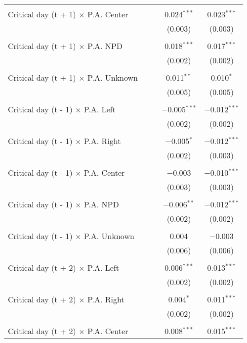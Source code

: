 \documentclass[
]{article}
\begin{document}
\begin{table}[!htbp]
{\begin{tabular}{@{\extracolsep{5pt}}lcccc}
  & & & & \\ 
 Critical day (t + 1) $\times$ P.A. Center &  &  & 0.024$^{***}$ & 0.023$^{***}$ \\ 
  &  &  & (0.003) & (0.003) \\ 
  & & & & \\ 
 Critical day (t + 1) $\times$ P.A. NPD &  &  & 0.018$^{***}$ & 0.017$^{***}$ \\ 
  &  &  & (0.002) & (0.002) \\ 
  & & & & \\ 
 Critical day (t + 1) $\times$ P.A. Unknown &  &  & 0.011$^{**}$ & 0.010$^{*}$ \\ 
  &  &  & (0.005) & (0.005) \\ 
  & & & & \\ 
 Critical day (t - 1) $\times$ P.A. Left &  &  & $-$0.005$^{***}$ & $-$0.012$^{***}$ \\ 
  &  &  & (0.002) & (0.002) \\ 
  & & & & \\ 
 Critical day (t - 1) $\times$ P.A. Right &  &  & $-$0.005$^{*}$ & $-$0.012$^{***}$ \\ 
  &  &  & (0.002) & (0.003) \\ 
  & & & & \\ 
 Critical day (t - 1) $\times$ P.A. Center &  &  & $-$0.003 & $-$0.010$^{***}$ \\ 
  &  &  & (0.003) & (0.003) \\ 
  & & & & \\ 
 Critical day (t - 1) $\times$ P.A. NPD &  &  & $-$0.006$^{**}$ & $-$0.012$^{***}$ \\ 
  &  &  & (0.002) & (0.002) \\ 
  & & & & \\ 
 Critical day (t - 1) $\times$ P.A. Unknown &  &  & 0.004 & $-$0.003 \\ 
  &  &  & (0.006) & (0.006) \\ 
  & & & & \\ 
 Critical day (t + 2) $\times$ P.A. Left &  &  & 0.006$^{***}$ & 0.013$^{***}$ \\ 
  &  &  & (0.002) & (0.002) \\ 
  & & & & \\ 
 Critical day (t + 2) $\times$ P.A. Right &  &  & 0.004$^{*}$ & 0.011$^{***}$ \\ 
  &  &  & (0.002) & (0.002) \\ 
  & & & & \\ 
 Critical day (t + 2) $\times$ P.A. Center &  &  & 0.008$^{***}$ & 0.015$^{***}$ \\ 

\end{tabular}}
\end{table}
\end{document}
